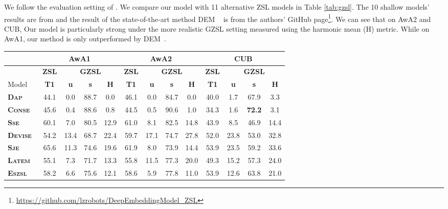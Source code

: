\documentclass[10pt,twocolumn,letterpaper]{article}
\begin{document}
 We follow the  evaluation setting of \cite{xian2017zero}. 
We compare our model with 11 alternative ZSL models in Table \ref{tab:gzsl}. The 10 shallow models’ results are from \cite{xian2017zero} and the result of the state-of-the-art method DEM ~\cite{zhang2017learning} is from the authors' GitHub page\footnote{\url{https://github.com/lzrobots/DeepEmbeddingModel_ZSL}}.
We can see that on AwA2 and CUB, Our model is particularly
strong under the more realistic GZSL setting measured using the harmonic mean
(H) metric. While on AwA1, our method is only outperformed by DEM~\cite{zhang2017learning}.





\setlength{\tabcolsep}{9pt}
\begin{table*}[ht]
\centering
\footnotesize
\begin{tabular}{@{} l|c|ccc|c|ccc|c|ccc @{}}
\toprule
&\multicolumn{4}{c|}{\bf AwA1}&\multicolumn{4}{c|}{\bf AwA2}&\multicolumn{4}{c}{\bf CUB}\\\midrule
&\bf ZSL & \multicolumn{3}{c|}{\bf GZSL} &\bf ZSL & \multicolumn{3}{c|}{\bf GZSL} &\bf ZSL & \multicolumn{3}{c}{\bf GZSL}\\
Model &\textbf{T1} & \textbf{u} & \textbf{s} & \textbf{H}&\textbf{T1} & \textbf{u} & \textbf{s} & \textbf{H} & \textbf{T1} & \textbf{u} & \textbf{s} & \textbf{H} \\
\midrule 
\textbf{\textsc{Dap}}~\cite{lampert2014attribute} &44.1 &0.0&88.7  &0.0 &46.1 &0.0 &84.7 &0.0 &40.0 &1.7& 67.9 &3.3\\ 
\textbf{\textsc{Conse}}~\cite{norouzi2013zero} &45.6 &0.4&88.6  &0.8 &44.5 &0.5 & 90.6&1.0 &34.3 &1.6& \textbf{72.2} &3.1\\ 
\textbf{\textsc{Sse}}~\cite{zhang2015zero} &60.1 &7.0& 80.5 &12.9 &61.0 &8.1 &82.5 &14.8 &43.9 &8.5&46.9  &14.4\\ 
\textbf{\textsc{Devise}}~\cite{frome2013devise} &54.2 &  13.4& 68.7 &22.4 &59.7 &17.1 & 74.7& 27.8&52.0 &  23.8& 53.0 &32.8\\ 
\textbf{\textsc{Sje}}~\cite{akata2015evaluation}  &65.6 &  11.3 &74.6 &19.6 &61.9 &8.0 &73.9 & 14.4&53.9 &  23.5 &59.2&33.6\\ 
\textbf{\textsc{Latem}}~\cite{xian2016latent}  &55.1 & 7.3 &71.7 &13.3 &55.8 &11.5 &77.3 & 20.0&49.3 & 15.2 &57.3 &24.0\\ 
\textbf{\textsc{Eszsl}}~\cite{romera2015embarrassingly}  &58.2 &  6.6& 75.6& 12.1 &58.6 &5.9 & 77.8& 11.0&53.9 &  12.6 &63.8&21.0\\ 

\end{tabular}
\end{table*}
\end{document}

